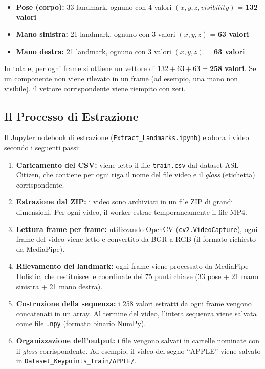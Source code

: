 \begin{itemize}
    \item \textbf{Pose (corpo):} 33 landmark, ognuno con 4 valori $(x, y, z, \textit{visibility})$ = \textbf{132 valori}
    \item \textbf{Mano sinistra:} 21 landmark, ognuno con 3 valori $(x, y, z)$ = \textbf{63 valori}
    \item \textbf{Mano destra:} 21 landmark, ognuno con 3 valori $(x, y, z)$ = \textbf{63 valori}
\end{itemize}

In totale, per ogni frame si ottiene un vettore di $132 + 63 + 63 = \mathbf{258}$ \textbf{valori}. Se un componente non viene rilevato in un frame (ad esempio, una mano non visibile), il vettore corrispondente viene riempito con zeri.

\subsection{Il Processo di Estrazione}

Il Jupyter notebook di estrazione (\texttt{Extract\_Landmarks.ipynb}) elabora i video secondo i seguenti passi:

\begin{enumerate}
    \item \textbf{Caricamento del CSV:} viene letto il file \texttt{train.csv} dal dataset ASL Citizen, che contiene per ogni riga il nome del file video e il \textit{gloss} (etichetta) corrispondente.

    \item \textbf{Estrazione dal ZIP:} i video sono archiviati in un file ZIP di grandi dimensioni. Per ogni video, il worker estrae temporaneamente il file MP4.

    \item \textbf{Lettura frame per frame:} utilizzando OpenCV (\texttt{cv2.VideoCapture}), ogni frame del video viene letto e convertito da BGR a RGB (il formato richiesto da MediaPipe).

    \item \textbf{Rilevamento dei landmark:} ogni frame viene processato da MediaPipe Holistic, che restituisce le coordinate dei 75 punti chiave (33 pose + 21 mano sinistra + 21 mano destra).

    \item \textbf{Costruzione della sequenza:} i 258 valori estratti da ogni frame vengono concatenati in un array. Al termine del video, l'intera sequenza viene salvata come file \texttt{.npy} (formato binario NumPy).

    \item \textbf{Organizzazione dell'output:} i file vengono salvati in cartelle nominate con il \textit{gloss} corrispondente. Ad esempio, il video del segno ``APPLE'' viene salvato in \texttt{Dataset\_Keypoints\_Train/APPLE/}.
\end{enumerate}

